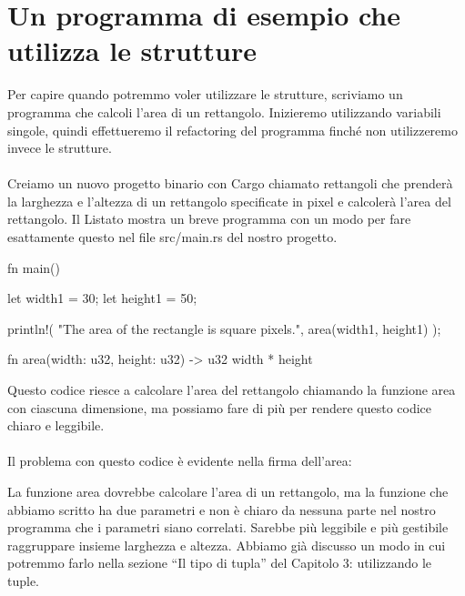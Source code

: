 \documentclass[11pt,a4paper]{article}
\begin{document}
\section{Un programma di esempio che utilizza le strutture}
Per capire quando potremmo voler utilizzare le strutture, scriviamo un programma che calcoli l'area di un rettangolo. Inizieremo utilizzando variabili singole, quindi effettueremo il refactoring del programma finché non utilizzeremo invece le strutture.\\
\\
Creiamo un nuovo progetto binario con Cargo chiamato rettangoli che prenderà la larghezza e l'altezza di un rettangolo specificate in pixel e calcolerà l'area del rettangolo. Il Listato mostra un breve programma con un modo per fare esattamente questo nel file src/main.rs del nostro progetto.
\begin{rust}
fn main() {
    let width1 = 30;
    let height1 = 50;

    println!(
        "The area of the rectangle is {} square pixels.",
        area(width1, height1)
    );
}

fn area(width: u32, height: u32) -> u32 {
    width * height
}
\end{rust}
Questo codice riesce a calcolare l'area del rettangolo chiamando la funzione area con ciascuna dimensione, ma possiamo fare di più per rendere questo codice chiaro e leggibile.\\
\\
Il problema con questo codice è evidente nella firma dell'area:
\begin{rust}
fn area(width: u32, height: u32) -> u32 {
\end{rust}
La funzione area dovrebbe calcolare l'area di un rettangolo, ma la funzione che abbiamo scritto ha due parametri e non è chiaro da nessuna parte nel nostro programma che i parametri siano correlati. Sarebbe più leggibile e più gestibile raggruppare insieme larghezza e altezza. Abbiamo già discusso un modo in cui potremmo farlo nella sezione “Il tipo di tupla” del Capitolo 3: utilizzando le tuple.
\end{document}
